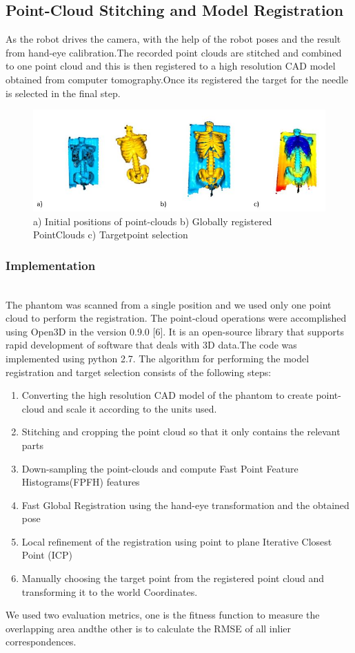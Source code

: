 \subsection{Point-Cloud Stitching and Model Registration}
As the robot drives the camera, with the help of the robot poses and the result from hand-eye calibration.The recorded point clouds are stitched and combined to one point cloud and this is then registered to a high resolution CAD model obtained from computer tomography.Once its registered the target for the needle is selected in the final step.
\begin{figure}[htbp]
\centerline{\includegraphics[width =.5\textwidth]{images/finalfig.JPG}}
\caption{a) Initial positions of point-clouds b) Globally registered PointClouds c) Targetpoint selection}
\label{fig}
\end{figure}
\subsubsection{Implementation} ~\\
The phantom was scanned from a single position and we used only one point cloud to perform the registration.
The point-cloud operations were accomplished using Open3D in the version 0.9.0 [6]. It is an open-source library that supports rapid development of software that deals with 3D data.The code was implemented using python 2.7.
The algorithm for performing the model registration and target selection consists of the following steps:
\begin{enumerate}
\item Converting the high resolution CAD model of the phantom to create point-cloud and scale it according to the units used.
\item Stitching and cropping the point cloud so that it only contains the relevant parts
\item Down-sampling the point-clouds and compute Fast Point Feature Histograms(FPFH) features
\item Fast Global Registration using the hand-eye transformation and the obtained pose
\item Local refinement of the registration using point to plane Iterative Closest Point (ICP)
\item Manually choosing the target point from the registered point cloud and transforming it to the world Coordinates.
\end{enumerate}
We used two evaluation metrics, one is the fitness function to measure the overlapping area andthe other is to calculate the RMSE of all inlier correspondences.
